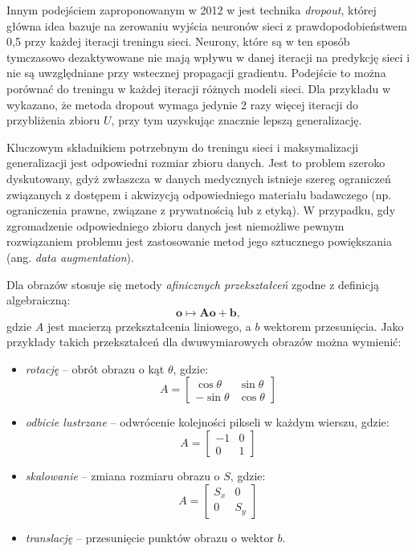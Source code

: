 Innym podejściem zaproponowanym w 2012 w \cite{DBLP:journals/corr/abs-1207-0580} jest technika \textit{dropout}, której główna idea bazuje na zerowaniu wyjścia neuronów sieci z prawdopodobieństwem 0,5 przy każdej iteracji treningu sieci. Neurony, które są w ten sposób tymczasowo dezaktywowane nie mają wpływu w danej iteracji na predykcję sieci i nie są uwzględniane przy wstecznej propagacji gradientu. Podejście to można porównać do treningu w każdej iteracji różnych modeli sieci. Dla przykładu w \cite{Krizhevsky2012} wykazano, że metoda dropout wymaga jedynie 2 razy więcej iteracji do przybliżenia zbioru $U$, przy tym uzyskując znacznie lepszą generalizację. 

Kluczowym składnikiem potrzebnym do treningu sieci i maksymalizacji generalizacji jest odpowiedni rozmiar zbioru danych. Jest to problem szeroko dyskutowany, gdyż zwłaszcza w danych medycznych istnieje szereg ograniczeń związanych z dostępem i akwizycją odpowiedniego materiału badawczego (np. ograniczenia prawne, związane z prywatnością lub z etyką). W przypadku, gdy zgromadzenie odpowiedniego zbioru danych jest niemożliwe pewnym rozwiązaniem problemu jest zastosowanie metod jego sztucznego powiększania (ang. \textit{data augmentation}).

Dla obrazów stosuje się metody \textit{afinicznych przekształceń} zgodne z definicją algebraiczną:
\begin{equation}
	\mathbf o \mapsto \mathbf{Ao} + \mathbf b,
\end{equation}
gdzie $A$ jest macierzą przekształcenia liniowego, a $b$ wektorem przesunięcia. Jako przykłady takich przekształceń dla dwuwymiarowych obrazów można wymienić:
\begin{itemize}
	\item \textit{rotację} -- obrót obrazu o kąt $\theta$, gdzie:
	\begin{equation}
	A = \begin{bmatrix} 
	\cos \theta & \sin \theta\\
	-\sin \theta & \cos \theta
	\end{bmatrix}
	\end{equation}	
	\item \textit{odbicie lustrzane} -- odwrócenie kolejności pikseli w każdym wierszu, gdzie:
	\begin{equation}
		A = \begin{bmatrix} 
		-1 & 0\\
		0 & 1
	\end{bmatrix}
	\end{equation}
	\item \textit{skalowanie} -- zmiana rozmiaru obrazu o $S$, gdzie:
	\begin{equation}
			A = \begin{bmatrix} 
		S_x & 0\\
		0 & S_y
	\end{bmatrix}
	\end{equation}
	\item \textit{translację} -- przesunięcie punktów obrazu o wektor $b$.
\end{itemize}

